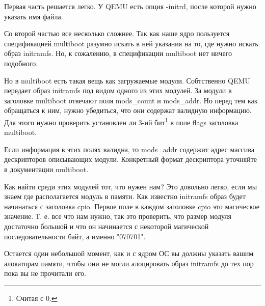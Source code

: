 Первая часть решается легко. У QEMU есть опция -initrd, после которой нужно
указать имя файла.

Со второй частью все несколько сложнее. Так как наше ядро пользуется спецификацией
multiboot разумно искать в ней указания на то, где нужно искать образ initramfs.
Но, к сожалению, в спецификации multiboot нет ничего подобного.

Но в multiboot есть такая вещь как загружаемые модули. Собтственно QEMU передает
образ initramfs под видом одного из этих модулей. За модули в заголовке multiboot
отвечают поля mods\_count и mods\_addr. Но перед тем как обращаться к ним, нужно
убедиться, что они содержат валидную информацию. Для этого нужно проверить
установлен ли 3-ий бит\footnote{Считая с 0.} в поле flags заголовка multiboot.

Если информация в этих полях валидна, то mods\_addr содержит адрес массива
дескрипторов описывающих модули. Конкретный формат дескриптора уточняйте в
документации multiboot.

Как найти среди этих модулей тот, что нужен нам? Это довольно легко, если мы
знаем где располагается модуль в памяти. Как известно initramfs образ будет
начинаться с заголовка cpio. Первое поле в каждом заголовке cpio это магическое
значение. Т. е. все что нам нужно, так это проверить, что размер модуля достаточно
большой и что он начинается с некоторой магической последовательности байт, а
именно "070701".

Остается один небольшой момент, как и с ядром ОС вы должны указать вашим
алокаторам памяти, чтобы они не могли алоцировать образ initramfs до тех пор
пока вы не прочитали его.
